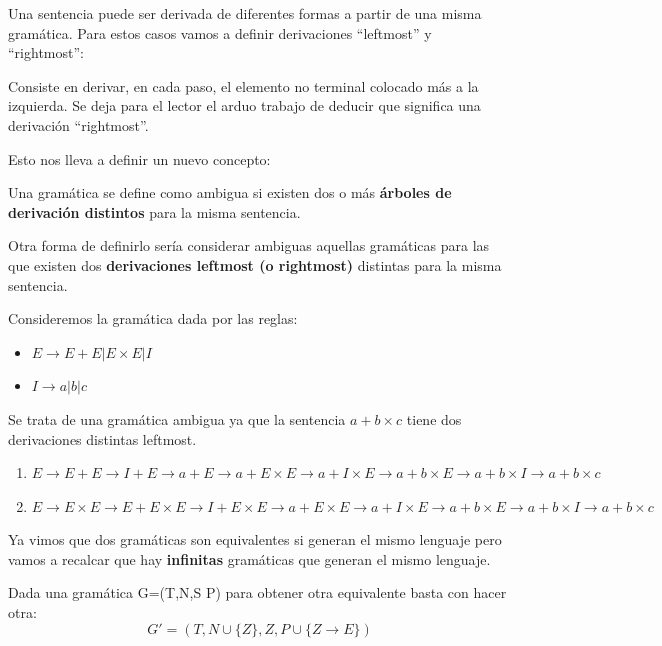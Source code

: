 \documentclass{apuntes}
\begin{document}
Una sentencia puede ser derivada de diferentes formas a partir de una misma gramática. Para estos casos vamos a definir derivaciones ``leftmost'' y ``rightmost'':

\begin{defn}[Leftmost]
Consiste en derivar, en cada paso, el elemento no terminal colocado más a la izquierda. Se deja para el lector el arduo trabajo de deducir que significa una derivación ``rightmost''.
\end{defn}

Esto nos lleva a definir un nuevo concepto:

\begin{defn}[Ambigüedad]
Una gramática se define como ambigua si existen dos o más \textbf{árboles de derivación distintos} para la misma sentencia.

Otra forma de definirlo sería considerar ambiguas aquellas gramáticas para las que existen dos \textbf{derivaciones leftmost (o rightmost)} distintas para la misma sentencia.
\end{defn}

\begin{example}
Consideremos la gramática dada por las reglas:
\begin{itemize}
\item $E \rightarrow E + E | E \times E | I$
\item $I \rightarrow a | b | c$
\end{itemize}

Se trata de una gramática ambigua ya que la sentencia $a+b\times c$ tiene dos derivaciones distintas leftmost.
\begin{enumerate}
\item $E \rightarrow E + E \rightarrow I + E \rightarrow a + E \rightarrow a + E \times E \rightarrow a + I \times E \rightarrow a + b \times E \rightarrow a + b \times I \rightarrow a + b \times c$
\item $E \rightarrow E \times E \rightarrow E + E \times E \rightarrow I + E \times E \rightarrow a + E \times E \rightarrow a + I \times E \rightarrow a+b \times E \rightarrow a + b \times I \rightarrow a + b \times c$
\end{enumerate}
\end{example}

Ya vimos que dos gramáticas son equivalentes si generan el mismo lenguaje pero vamos a recalcar que hay \textbf{infinitas} gramáticas que generan el mismo lenguaje.

Dada una gramática G=(T,N,S P) para obtener otra equivalente basta con hacer otra:
\[G' =(T, N \cup \lbrace Z \rbrace, Z, P \cup \lbrace Z \rightarrow E \rbrace)\]
\end{document}
